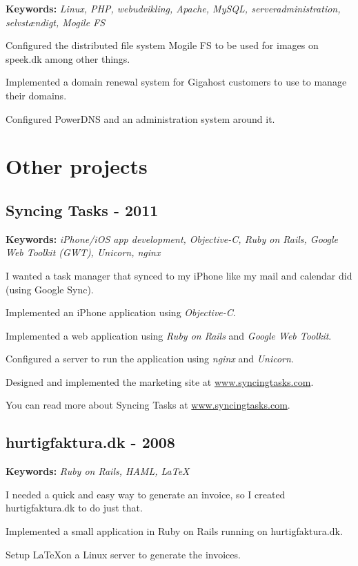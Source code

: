 \documentclass[a4paper]{article}
\renewenvironment{itemize}{
  \begin{list}{}
    { \setlength{\itemsep}{5pt}
      \setlength{\parsep}{0pt}
      \setlength{\topsep}{0pt}
      \setlength{\leftmargin}{0em} } }{
  \end{list}}
\newcommand{\keywords}[1]{\small\textbf{Keywords:} \emph{#1}\normalsize}
\begin{document}
\keywords{Linux, PHP, webudvikling, Apache, MySQL, serveradministration, selvstændigt, Mogile FS}

\begin{itemize}
	\item Configured the distributed file system Mogile FS to be used for images on speek.dk among other things.
	\item Implemented a domain renewal system for Gigahost customers to use to manage their domains.
	\item Configured PowerDNS and an administration system around it.
\end{itemize}

\section*{Other projects}

\subsection*{Syncing Tasks - 2011}
\keywords{iPhone/iOS app development, Objective-C, Ruby on Rails, Google Web Toolkit (GWT), Unicorn, nginx}

I wanted a task manager that synced to my iPhone like my mail and calendar did (using Google Sync).

\begin{itemize}
\item Implemented an iPhone application using \emph{Objective-C}.
\item Implemented a web application using \emph{Ruby on Rails} and \emph{Google Web Toolkit}.
\item Configured a server to run the application using \emph{nginx} and \emph{Unicorn}.
\item Designed and implemented the marketing site at \href{http://www.syncingtasks.com}{www.syncingtasks.com}.
\end{itemize}

You can read more about Syncing Tasks at \href{http://www.syncingtasks.com}{www.syncingtasks.com}.
\subsection*{hurtigfaktura.dk - 2008}
\keywords{Ruby on Rails, HAML, \LaTeX}

I needed a quick and easy way to generate an invoice, so I created hurtigfaktura.dk to do just that.

\begin{itemize}
	\item Implemented a small application in Ruby on Rails running on hurtigfaktura.dk.
	\item Setup \LaTeX on a Linux server to generate the invoices.
\end{itemize}
\end{document}
